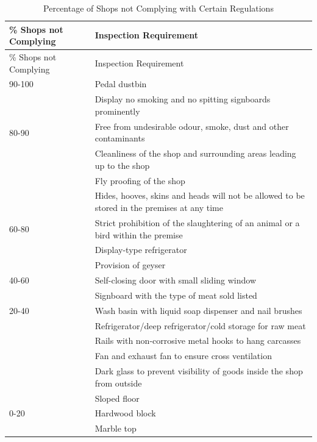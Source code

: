 \documentclass[a4paper, 12pt]{article}
\newcommand\tabitem{\makebox[1em][r]{\textbullet~}}
\begin{document}
\begin{longtable}{>{\raggedright}p{5cm}>{\raggedright\arraybackslash}p{10cm}}
\caption{Percentage of Shops not Complying with Certain Regulations} \\ 
\% Shops not Complying & Inspection Requirement \\
\toprule
\endfirsthead
\% Shops not Complying & Inspection Requirement \\
\toprule
\endhead
\endfoot
\hline
\endlastfoot

90-100 & \tabitem Pedal dustbin \\
 & \tabitem Display no smoking and no spitting signboards prominently \\
 \midrule
80-90 & \tabitem Free from undesirable odour, smoke, dust and other contaminants \\
 &  \tabitem Cleanliness of the shop and surrounding areas leading up to the shop \\
 & \tabitem Fly proofing of the shop \\
 & \tabitem Hides, hooves, skins and heads will not be allowed to be stored in the premises at any time \\
\midrule
60-80 & \tabitem Strict prohibition of the slaughtering of an animal or a bird within the premise \\
 & \tabitem Display-type refrigerator \\
 & \tabitem Provision of geyser \\
\midrule
40-60 & \tabitem Self-closing door with small sliding window \\
 & \tabitem Signboard with the type of meat sold listed \\
\midrule
20-40 & \tabitem Wash basin with liquid soap dispenser and nail brushes \\
 & \tabitem Refrigerator/deep refrigerator/cold storage for raw meat \\
 & \tabitem Rails with non-corrosive metal hooks to hang carcasses \\
 & \tabitem Fan and exhaust fan to ensure cross ventilation \\
 & \tabitem Dark glass to prevent visibility of goods inside the shop from outside \\
 & \tabitem Sloped floor \\
\midrule
0-20 & \tabitem Hardwood block \\
 & \tabitem Marble top \\

\end{longtable}
\end{document}
